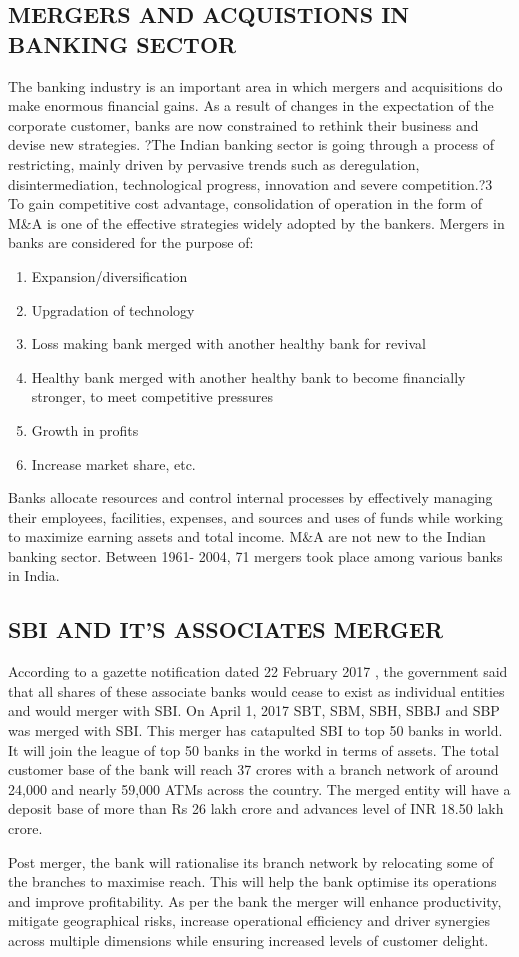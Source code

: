 \documentclass[a4paper, 14pt]{article}
\begin{document}
{\subsection{MERGERS AND ACQUISTIONS IN BANKING SECTOR}
The banking industry is an important area in which mergers and acquisitions do make enormous financial gains. As a result of changes in the expectation of the corporate customer, banks are now constrained to rethink their business and devise new strategies. ?The Indian banking sector is going through a process of restricting, mainly driven by pervasive trends such as deregulation, disintermediation, technological progress, innovation and severe competition.?3 To gain competitive cost advantage, consolidation of operation in the form of M\&A is one of the effective strategies widely adopted by the bankers. Mergers in banks are considered for the purpose of:
\begin{enumerate}
\item Expansion/diversification
\item Upgradation of technology
\item Loss making bank merged with another healthy bank for revival
\item Healthy bank merged with another healthy bank to become financially
stronger, to meet competitive pressures
\item Growth in profits
\item Increase market share, etc.
\end{enumerate}
Banks allocate resources and control internal processes by effectively
managing their employees, facilities, expenses, and sources and uses of funds while working to maximize earning assets and total income. M\&A are not new to the Indian banking sector. Between 1961- 2004, 71 mergers took place among various banks in India.
\subsection {SBI AND IT'S ASSOCIATES MERGER}
\par According to a gazette notification dated 22 February 2017 , the government said that all shares of these associate banks would cease to exist as individual entities and would merger with SBI. On April 1, 2017 SBT, SBM, SBH, SBBJ and SBP was merged with SBI. This merger has catapulted SBI to top 50 banks in world. It will join the league of top 50 banks in the workd in terms of assets. The total customer base of the bank will reach 37 crores with a branch network of around 24,000 and nearly 59,000 ATMs across the country. The merged entity will have a deposit base of more than Rs 26 lakh crore and advances level of INR 18.50 lakh crore.
\par Post merger, the bank will rationalise its branch network by relocating some of the branches to maximise reach. This will help the bank optimise its operations and improve profitability. As per the bank the merger will enhance productivity, mitigate geographical risks, increase operational efficiency and driver synergies across multiple dimensions while ensuring increased levels of customer delight.

}
\end{document}
